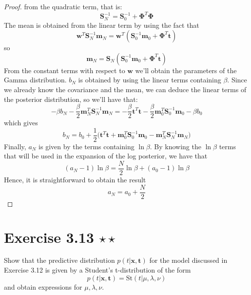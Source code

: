 \begin{proof}
    from the quadratic term, that is:
    \begin{equation*}
         \mathbf{S}_N^{-1} = \mathbf{S}_0^{-1} + \mathbf{\Phi}^T\mathbf{\Phi}
        \label{eq:3.51*}\tag{3.51*}
    \end{equation*}
    The mean is obtained from the linear term by using the fact that
    \[
        \mathbf{w}^T \mathbf{S}_N^{-1} \mathbf{m}_N
        = \mathbf{w}^T(\mathbf{S}_0^{-1} \mathbf{m}_0 + \mathbf{\Phi}^T \mathbf{t})
    \] 
    so 
    \begin{equation*}
        \mathbf{m}_N = \mathbf{S}_N 
            (\mathbf{S}_0^{-1} \mathbf{m}_0 + \mathbf{\Phi}^T \mathbf{t})
        \label{eq:3.50*}\tag{3.50*}
    \end{equation*}
    From the constant terms with respect to $\mathbf{w}$ we'll obtain the
    parameters of the Gamma distribution. $b_N$ is obtained by using the 
    linear terms containing  $\beta$. Since we already know the covariance and the 
    mean, we can deduce the linear terms of the posterior distribution, so we'll have
    that:
    \[
        - \beta b_N
        -\frac{\beta}{2} \mathbf{m}_N^T \mathbf{S}_N^{-1} \mathbf{m}_N
        = -\frac{\beta}{2} \mathbf{t}^T\mathbf{t} 
        -\frac{\beta}{2} \mathbf{m}_0^T \mathbf{S}_0^{-1} \mathbf{m}_0
        -\beta b_0
    \]
    which gives
    \begin{equation*}
        b_N 
        = b_0 + \frac{1}{2} \big(
            \mathbf{t}^T\mathbf{t} + \mathbf{m}_0^T\mathbf{S}_0^{-1}\mathbf{m}_0
            - \mathbf{m}_N^T\mathbf{S}_N^{-1}\mathbf{m}_N\big)
        \tag{3.12.1}\label{eq:3.12.1}
    \end{equation*}
    Finally, $a_N$ is given by the terms containing $\ln \beta$. 
    By knowing the $\ln \beta$ terms that will be used in the expansion of the 
    log posterior, we have that
    \[
        (a_N - 1) \ln \beta = \frac{N}{2} \ln \beta + (a_0 - 1) \ln \beta
    \] 
    Hence, it is straightforward to obtain the result
    \begin{equation*}
        a_N = a_0 + \frac{N}{2}
        \tag{2.150}\label{eq:2.150}
    \end{equation*}
\end{proof}

\section*{Exercise 3.13 $\star \star$}
Show that the predictive distribution $p(t | \mathbf{x}, \mathbf{t})$ for the 
model discussed in Exercise 3.12 is given by a Student's t-distribution of
the form
\begin{equation*}
    p(t | \mathbf{x}, \mathbf{t}) = \text{St}(t | \mu, \lambda, \nu)
    \tag{3.114}\label{eq:3.114}
\end{equation*}
and obtain expressions for $\mu, \lambda, \nu$.

